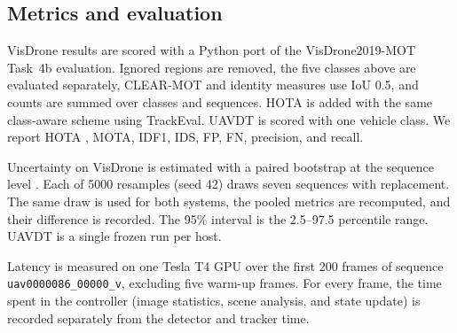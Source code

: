 \subsection{Metrics and evaluation}
VisDrone results are scored with a Python port of the VisDrone2019-MOT
Task~4b evaluation. Ignored regions are removed, the five classes above are
evaluated separately, CLEAR-MOT and identity measures use IoU 0.5, and counts
are summed over classes and sequences. HOTA is added with the same class-aware
scheme using TrackEval. UAVDT is scored with one vehicle class. We report
HOTA \cite{luiten2021hota}, MOTA, IDF1, IDS, FP, FN, precision, and recall.

Uncertainty on VisDrone is estimated with a paired bootstrap at the sequence
level \cite{efron1993bootstrap}. Each of 5000 resamples (seed 42) draws seven
sequences with replacement. The same draw is used for both systems, the pooled
metrics are recomputed, and their difference is recorded. The 95\% interval
is the 2.5--97.5 percentile range. UAVDT is a single frozen run per host.

Latency is measured on one Tesla T4 GPU over the first 200 frames of sequence
\texttt{uav0000086\_00000\_v}, excluding five warm-up frames. For every
frame, the time spent in the controller (image statistics, scene analysis, and
state update) is recorded separately from the detector and tracker time.
